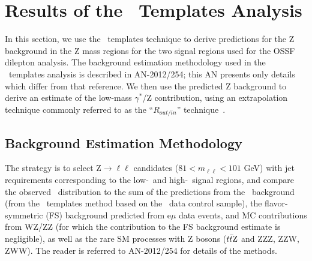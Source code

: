 \section{Results of the \MET\ Templates Analysis}
\label{sec:templates}

In this section, we use the \MET\ templates technique to derive predictions for the Z background in the Z mass regions for the 
two signal regions used for the OSSF dilepton analysis. The background estimation methodology used in the \MET\ templates analysis
is described in AN-2012/254; this AN presents only details which differ from that reference. 
We then use the predicted Z background to derive an estimate of the low-mass $\gamma^*$/Z contribution,
using an extrapolation technique commonly referred to as the ``$R_{out/in}$'' technique~\cite{ref:routin}.

\subsection{Background Estimation Methodology}
\label{sec:templates_bkg}

The strategy is to select Z$\to\ell\ell$ candidates ($81<m_{\ell\ell}<101$ GeV) with jet requirements corresponding to the
low-\MET\ and high-\MET\ signal regions, and compare the observed \MET\ distribution to the sum of the predictions from the 
\zjets\ background (from the \MET\ templates method based on the \gjets\ data control sample), the flavor-symmetric (FS) 
background predicted from e$\mu$ data events, and MC contributions from WZ/ZZ (for which the contribution to the FS background 
estimate is negligible), as well as the rare SM processes with 
Z bosons ($t\bar{t}\rm{Z}$ and ZZZ, ZZW, ZWW). The reader is referred to AN-2012/254 for details of the methods.

